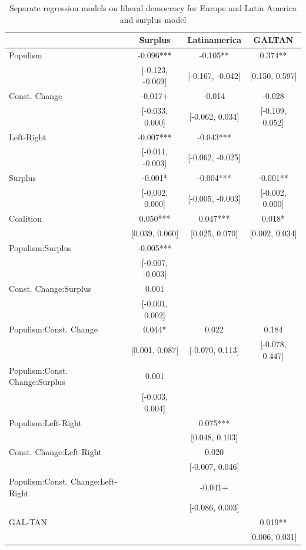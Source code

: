 \documentclass[
  abstract]{article}
\begin{document}
\elandscape

\hypertarget{tbl-libdem_sep}{}
\begin{table}
\caption{\label{tbl-libdem_sep}Separate regression models on liberal democracy for Europe and Latin
America and surplus model }\tabularnewline

\centering\centering\centering
\begin{tabular}[t]{lccc}
\toprule
  & Surplus & Latinamerica & GALTAN\\
\midrule
Populism & -0.096*** & -0.105** & 0.374**\\
 & {}[-0.123, -0.069] & {}[-0.167, -0.042] & {}[0.150, 0.597]\\
Const. Change & -0.017+ & -0.014 & -0.028\\
 & {}[-0.033, 0.000] & {}[-0.062, 0.034] & {}[-0.109, 0.052]\\
Left-Right & -0.007*** & -0.043*** & \\
 & {}[-0.011, -0.003] & {}[-0.062, -0.025] & \\
Surplus & -0.001* & -0.004*** & -0.001**\\
 & {}[-0.002, 0.000] & {}[-0.005, -0.003] & {}[-0.002, 0.000]\\
Coalition & 0.050*** & 0.047*** & 0.018*\\
 & {}[0.039, 0.060] & {}[0.025, 0.070] & {}[0.002, 0.034]\\
Populism:Surplus & -0.005*** &  & \\
 & {}[-0.007, -0.003] &  & \\
Const. Change:Surplus & 0.001 &  & \\
 & {}[-0.001, 0.002] &  & \\
Populism:Const. Change & 0.044* & 0.022 & 0.184\\
 & {}[0.001, 0.087] & {}[-0.070, 0.113] & {}[-0.078, 0.447]\\
Populism:Const. Change:Surplus & 0.001 &  & \\
 & {}[-0.003, 0.004] &  & \\
Populism:Left-Right &  & 0.075*** & \\
 &  & {}[0.048, 0.103] & \\
Const. Change:Left-Right &  & 0.020 & \\
 &  & {}[-0.007, 0.046] & \\
Populism:Const. Change:Left-Right &  & -0.041+ & \\
 &  & {}[-0.086, 0.003] & \\
GAL-TAN &  &  & 0.019**\\
 &  &  & {}[0.006, 0.031]\\

\end{tabular}
\end{table}
\end{document}
